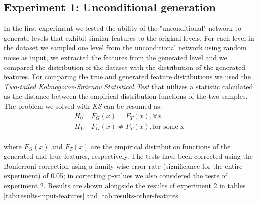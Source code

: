 \subsection{Experiment 1: Unconditional generation}
In the first experiment we tested the ability of the "unconditional" network to generate levels that exhibit similar features to the original levels. 
For each level in the dataset we sampled one level from the unconditional network using random noise as input, we extracted the features from the generated level and we compared the distribution of the dataset with the distribution of the generated features. For comparing the true and generated feature distributions we used the \textit{Two-tailed Kolmogorov-Smirnov Statistical Test} \cite{KS-test} that utilizes a statistic calculated as the distance  between the empirical distribution functions of the two samples. The problem we solved with \textit{KS} can be resumed as: \\

\begin{equation}
	\begin{split}
	H_{0}:  & F_{G}(x) = F_{T}(x), \forall x \\
	H_{1}:  & F_{G}(x) \neq F_{T}(x), \text{for some x} \\
	\end{split}
\end{equation}

where $F_{G}(x)$ and $F_{T}(x)$ are the empirical distribution functions of the generated and true features, respectively. The tests have been corrected using the Bonferroni correction using a family-wise error rate (significance for the entire experiment) of 0.05; in correcting p-values we also considered the tests of experiment 2. Results are shown alongside the results of experiment 2 in tables \ref{tab:results-input-features} and \ref{tab:results-other-features}.

